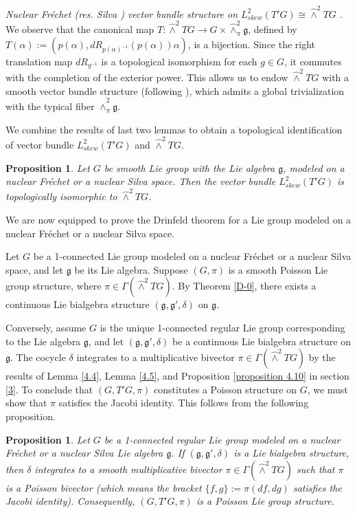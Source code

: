\documentclass[11pt,reqno]{amsart}
\newtheorem{proposition}[theorem]{Proposition}
\theoremstyle{definition}
\numberwithin{equation}{section}
\begin{document}
\textit{Nuclear Fr\'echet (res. Silva ) vector bundle structure on $L^2_{skew}(T'G)\cong\hat\wedge^2 TG$ .}\\
We observe that the canonical map $T : \hat\wedge^2 TG \rightarrow G \times \hat\wedge^2_{\pi} \mathfrak{g}$, defined by $T(\alpha) := (p(\alpha), dR_{p(\alpha)^{-1}}(p(\alpha))\alpha)$, is a bijection. Since the right translation map $dR_{g^{-1}}$ is a topological isomorphism for each $g \in G$, it commutes with the completion of the exterior power. This allows us to endow $\hat\wedge^2 TG$ with a smooth vector bundle structure (following \cite[3.7]{11}), which admits a global trivialization with the typical fiber $\hat\wedge^2_{\pi} \mathfrak{g}$.

We combine the results of last two lemmas to obtain a topological identification of vector bundle $L^2_{skew}(T'G)$ and $\hat\wedge^2 TG$.
\begin{proposition}
  Let $G$ be smooth Lie group with the Lie algebra $\mathfrak g$, modeled on a nuclear Fr\'echet or a nuclear Silva space.  Then the vector bundle $L^2_{skew}(T'G)$ is topologically isomorphic to $\hat\wedge^2 TG$.
\end{proposition}


We are now equipped to prove the Drinfeld theorem for a Lie group modeled on a nuclear Fréchet or a nuclear Silva space.

Let $G$ be a 1-connected Lie group modeled on a nuclear Fréchet or a nuclear Silva space, and let $\mathfrak{g}$ be its Lie algebra. Suppose $(G, \pi)$ is a smooth Poisson Lie group structure, where $\pi \in \Gamma(\hat\wedge^2 TG)$. By Theorem \ref{D-0}, there exists a continuous Lie bialgebra structure $(\mathfrak{g}, \mathfrak{g}', \delta)$ on $\mathfrak{g}$.



Conversely, assume $G$ is the unique 1-connected regular Lie group corresponding to the Lie algebra $\mathfrak{g}$, and let $(\mathfrak{g}, \mathfrak{g}', \delta)$ be a continuous Lie bialgebra structure on $\mathfrak{g}$. The cocycle $\delta$ integrates to a multiplicative bivector $\pi \in \Gamma(\hat\wedge^2 TG)$ by the results of Lemma \ref{4.4}, Lemma \ref{4.5}, and Proposition \ref{proposition 4.10} in section \ref{3}. To conclude that $(G, T'G, \pi)$ constitutes a Poisson structure on $G$, we must show that $\pi$ satisfies the Jacobi identity. This follows from the following proposition.


\begin{proposition}
Let $G$ be a 1-connected regular Lie group modeled on a nuclear Fréchet or a nuclear Silva Lie algebra $\mathfrak{g}$. If $(\mathfrak{g}, \mathfrak{g}', \delta)$ is a Lie bialgebra structure, then $\delta$ integrates to a smooth multiplicative bivector $\pi \in \Gamma(\hat{\wedge}^2 TG)$ such that $\pi$ is a Poisson bivector (which means the bracket $\{f, g\} := \pi(df, dg)$ satisfies the Jacobi identity). Consequently, $(G, T'G, \pi)$ is a Poisson Lie group structure.
\end{proposition}
\end{document}
